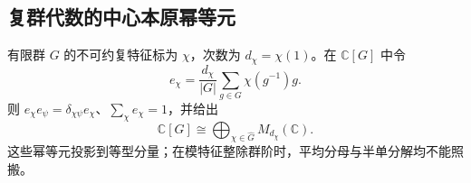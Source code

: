 \documentclass[../main.tex]{subfiles}
\begin{document}
\subsection{复群代数的中心本原幂等元}
有限群 $G$ 的不可约复特征标为 $\chi$，次数为 $d_\chi=\chi(1)$。在 $\mathbb C[G]$ 中令
\[
e_\chi=\frac{d_\chi}{|G|}\sum_{g\in G}\chi(g^{-1})g.
\]
则 $e_\chi e_\psi=\delta_{\chi\psi}e_\chi$、$\sum_\chi e_\chi=1$，并给出
\[
\mathbb C[G]\cong\bigoplus_{\chi\in\widehat G}M_{d_\chi}(\mathbb C).
\]
这些幂等元投影到等型分量；在模特征整除群阶时，平均分母与半单分解均不能照搬。
\clearpage
\end{document}

